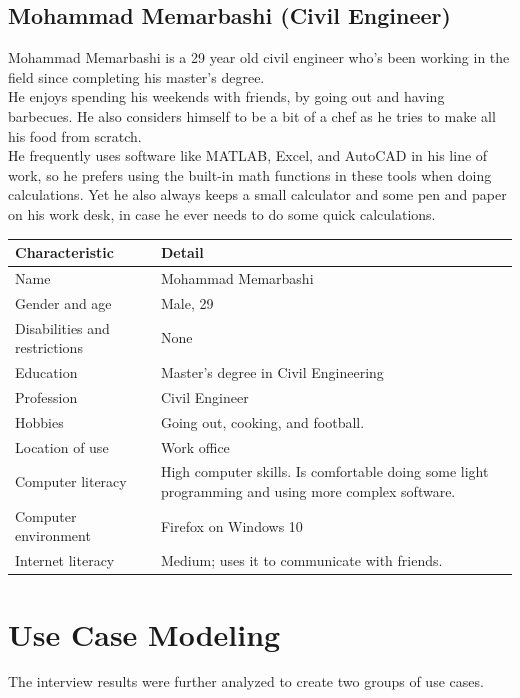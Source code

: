 \documentclass[11pt,onside]{report}
\begin{document}
\subsection{Mohammad Memarbashi (Civil Engineer)}
Mohammad Memarbashi is a 29 year old civil engineer who’s been working in the field since completing his master’s degree. \\

He enjoys spending his weekends with friends, by going out and having barbecues. He also considers himself to be a bit of a chef as he tries to make all his food from scratch. \\

He frequently uses software like MATLAB, Excel, and AutoCAD in his line of work, so he prefers using the built-in math functions in these tools when doing calculations. Yet he also always keeps a small calculator and some pen and paper on his work desk, in case he ever needs to do some quick calculations.
\begin{center}
    \begin{tabular}{|p{4cm}|p{10cm}|}
        \hline
        \bf{Characteristic} & \bf{Detail} \\
        \hline
        Name &   Mohammad Memarbashi \\
        \hline
        Gender and age & Male, 29 \\
        \hline
        Disabilities and restrictions & None \\
        \hline
        Education & Master's degree in Civil Engineering \\
        \hline
        Profession & Civil Engineer \\
        \hline
        Hobbies & Going out, cooking, and football. \\
        \hline
        Location of use & Work office \\
        \hline
        Computer literacy & High computer skills. Is comfortable doing some light programming and using more complex software. \\
        \hline
        Computer environment &  Firefox on Windows 10 \\
        \hline
        Internet literacy & Medium; uses it to communicate with friends. \\
        \hline
    \end{tabular}
\end{center}

\section{Use Case Modeling}
The interview results were further analyzed to create two groups of use cases. \\
\end{document}
